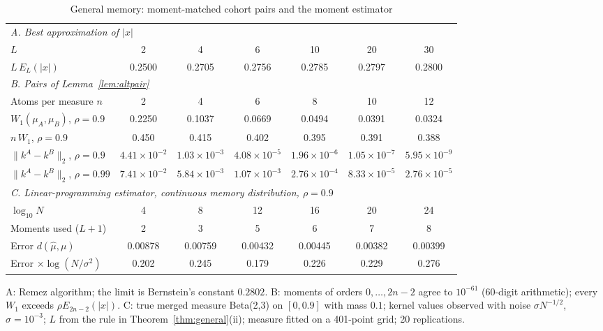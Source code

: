 \documentclass[12pt]{article}
\theoremstyle{definition}
\theoremstyle{remark}
\begin{document}
\begin{table}[t]\centering\small
\begin{threeparttable}
\caption{General memory: moment-matched cohort pairs and the moment estimator}\label{tab:general}
\setlength{\tabcolsep}{3.5pt}
\begin{tabular}{lcccccc}
\toprule
\multicolumn{7}{l}{\emph{A. Best approximation of $|x|$}}\\
$L$ & 2 & 4 & 6 & 10 & 20 & 30\\
$L\,E_L(|x|)$ & 0.2500 & 0.2705 & 0.2756 & 0.2785 & 0.2797 & 0.2800\\
\midrule
\multicolumn{7}{l}{\emph{B. Pairs of Lemma~\ref{lem:altpair}}}\\
Atoms per measure $n$ & 2 & 4 & 6 & 8 & 10 & 12\\
$W_1(\mu_A,\mu_B)$, $\rho=0.9$ & 0.2250 & 0.1037 & 0.0669 & 0.0494 & 0.0391 & 0.0324\\
$n\,W_1$, $\rho=0.9$ & 0.450 & 0.415 & 0.402 & 0.395 & 0.391 & 0.388\\
$\|k^A-k^B\|_2$, $\rho=0.9$ & $4.41\times10^{-2}$ & $1.03\times10^{-3}$ & $4.08\times10^{-5}$ & $1.96\times10^{-6}$ & $1.05\times10^{-7}$ & $5.95\times10^{-9}$\\
$\|k^A-k^B\|_2$, $\rho=0.99$ & $7.41\times10^{-2}$ & $5.84\times10^{-3}$ & $1.07\times10^{-3}$ & $2.76\times10^{-4}$ & $8.33\times10^{-5}$ & $2.76\times10^{-5}$\\
\midrule
\multicolumn{7}{l}{\emph{C. Linear-programming estimator, continuous memory distribution, $\rho=0.9$}}\\
$\log_{10}N$ & 4 & 8 & 12 & 16 & 20 & 24\\
Moments used ($L+1$) & 2 & 3 & 5 & 6 & 7 & 8\\
Error $d(\hat\mu,\mu)$ & 0.00878 & 0.00759 & 0.00432 & 0.00445 & 0.00382 & 0.00399\\
Error $\times\log(N/\sigma^2)$ & 0.202 & 0.245 & 0.179 & 0.226 & 0.229 & 0.276\\
\bottomrule
\end{tabular}
\begin{tablenotes}\footnotesize\item A: Remez algorithm; the limit is Bernstein's constant $0.2802$. B: moments of orders $0,\ldots,2n-2$ agree to $10^{-61}$ (60-digit arithmetic); every $W_1$ exceeds $\rho E_{2n-2}(|x|)$. C: true merged measure Beta(2,3) on $[0,0.9]$ with mass $0.1$; kernel values observed with noise $\sigma N^{-1/2}$, $\sigma=10^{-3}$; $L$ from the rule in Theorem~\ref{thm:general}(ii); measure fitted on a 401-point grid; 20 replications.\end{tablenotes}
\end{threeparttable}
\end{table}
\end{document}
